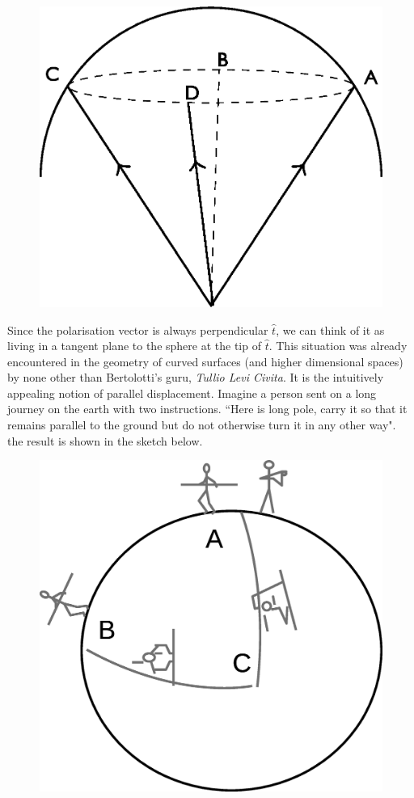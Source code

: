 \begin{figure}[H]
\centering
\includegraphics[scale=0.27]{src/images/chap26/21.jpg}
\end{figure}
\bigskip

Since the polarisation vector is always perpendicular $\hat{t}$, we can think of it as
living in a tangent plane to the sphere at the tip of $\hat{t}$. This situation was already
encountered in the geometry of curved surfaces (and higher dimensional spaces)
by none other than Bertolotti's guru, \textit{Tullio Levi Civita}. It is the intuitively
appealing notion of parallel displacement. Imagine a person sent on a long
journey on the earth with two instructions. ``Here is long pole, carry it so that
it remains parallel to the ground but do not otherwise turn it in any other way".
the result is shown in the sketch below.
\medskip

\begin{figure}[H]
\centering
\includegraphics[scale=0.34]{src/images/chap26/journey.jpg}
\end{figure}
\medskip

